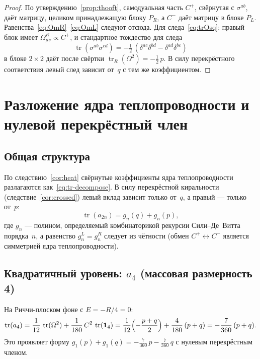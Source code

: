 \documentclass[12pt,a4paper]{article}
\theoremstyle{definition}
\theoremstyle{remark}
\newcommand{\tr}{\operatorname{tr}}
\newcommand{\half}{\tfrac{1}{2}}
\begin{document}
\begin{proof}
По утверждению~\ref{prop:thooft}, самодуальная часть $C^+$, свёрнутая
с $\sigma^{ab}$, даёт матрицу, целиком принадлежащую блоку $P_R$, а
$C^-$ даёт матрицу в блоке $P_L$.
Равенства~\eqref{eq:OmR}--\eqref{eq:OmL} следуют отсюда.  Для
следа~\eqref{eq:trOsq}: правый блок имеет
$\Omega^R_{\mu\nu} \propto C^+$, и стандартное тождество для следа
\begin{equation}
  \tr(\sigma^{ab}\sigma^{cd})
  = -\half\,(\delta^{ac}\delta^{bd} - \delta^{ad}\delta^{bc})
\end{equation}
в блоке $2 \times 2$ даёт после свёртки
$\tr_R(\Omega^2) = -\half\,p$.  В силу перекрёстного соответствия левый
след зависит от~$q$ с тем же коэффициентом.
\end{proof}


\section{Разложение ядра теплопроводности и нулевой перекрёстный член}
\label{sec:heat}

\subsection{Общая структура}

По следствию~\ref{cor:heat} свёрнутые коэффициенты ядра теплопроводности
разлагаются как~\eqref{eq:tr-decompose}.  В силу перекрёстной киральности
(следствие~\ref{cor:crossed}) левый вклад зависит только от~$q$, а правый
--- только от~$p$:
\begin{equation}\label{eq:fn-decompose}
  \tr(a_{2n}) = g_n(q) + g_n(p),
\end{equation}
где $g_n$ --- полином, определяемый комбинаторикой рекурсии
Сили--Де~Витта порядка~$n$, а равенство $g_n^L = g_n^R$ следует из чётности
(обмен $C^+ \leftrightarrow C^-$ является симметрией ядра
теплопроводности).

\subsection{Квадратичный уровень: \texorpdfstring{$a_4$}{a4} (массовая размерность 4)}
\label{sec:a4}

На Риччи-плоском фоне с $E = -R/4 = 0$:
\begin{equation}\label{eq:a2}
  \tr(a_4) = \frac{1}{12}\,\tr(\Omega^2) + \frac{1}{180}\,C^2\,\tr(\mathbf{1}_4)
  = \frac{1}{12}\Bigl(-\frac{p+q}{2}\Bigr) + \frac{4}{180}\,(p+q)
  = -\frac{7}{360}\,(p + q).
\end{equation}
Это проявляет форму $g_1(p) + g_1(q) = -\frac{7}{360}\,p
- \frac{7}{360}\,q$ с нулевым перекрёстным членом.
\end{document}
